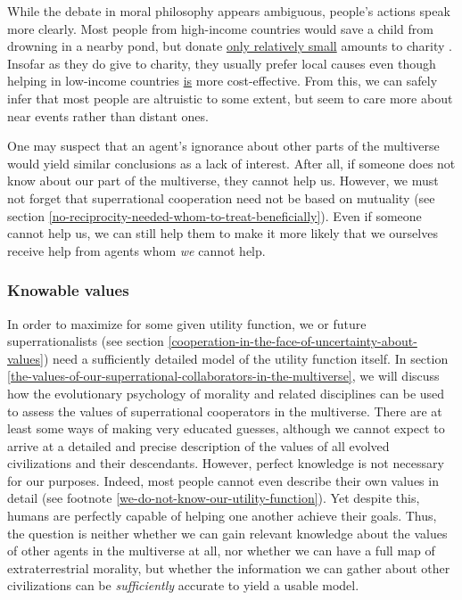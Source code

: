 While the debate in moral philosophy appears ambiguous, people's actions
speak more clearly. Most people from high-income countries would save a
child from drowning in a nearby pond, but donate
\href{http://nccs.urban.org/nccs/statistics/charitable-giving-in-america-some-facts-and-figures.cfm}{only
relatively small} amounts to charity
\parencite{Singer1972-uk}. Insofar as they do give to
charity, they usually prefer local causes even though helping in
low-income countries
\href{http://www.givewell.org/giving101/Your-dollar-goes-further-overseas}{is}
more cost-effective. From this, we can safely infer that most people are
altruistic to some extent, but seem to care more about near events
rather than distant ones.

One may suspect that an agent's ignorance about other parts of the
multiverse would yield similar conclusions as a lack of interest. After
all, if someone does not know about our part of the multiverse, they
cannot help us. However, we must not forget that superrational
cooperation need not be based on mutuality (see section
\ref{no-reciprocity-needed-whom-to-treat-beneficially}). Even if someone
cannot help us, we can still help them to make it more likely that we
ourselves receive help from agents whom \emph{we} cannot help.

\subsubsection{Knowable values}\label{knowable-values}

In order to maximize for some given utility function, we or future
superrationalists (see section
\ref{cooperation-in-the-face-of-uncertainty-about-values}) need a
sufficiently detailed model of the utility function itself. In section
\ref{the-values-of-our-superrational-collaborators-in-the-multiverse}, we will discuss how the
evolutionary psychology of morality and related disciplines can be used to assess the values of
superrational cooperators in the multiverse. There are at least some ways of making very educated
guesses, although we cannot expect to arrive at a detailed and precise description of the values of
all evolved civilizations and their descendants. However, perfect knowledge is not necessary for our
purposes. Indeed, most people cannot even describe their own values in detail (see footnote
\ref{we-do-not-know-our-utility-function}). Yet despite this, humans are perfectly capable of
helping one another achieve their goals. Thus, the question is neither whether we can gain relevant
knowledge about the values of other agents in the multiverse at all, nor whether we can have a full
map of extraterrestrial morality, but whether the information we can gather about other
civilizations can be \emph{sufficiently} accurate to yield a usable model.

